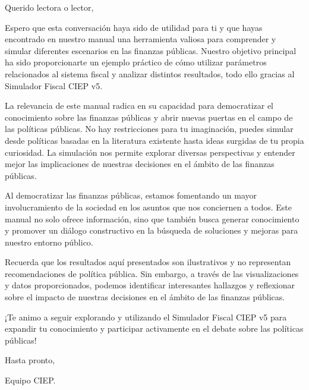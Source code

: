 Querido lectora o lector,

Espero que esta conversación haya sido de utilidad para ti y que hayas
encontrado en nuestro manual una herramienta valiosa para comprender y
simular diferentes escenarios en las finanzas públicas. Nuestro objetivo
principal ha sido proporcionarte un ejemplo práctico de cómo utilizar
parámetros relacionados al sistema fiscal y analizar distintos
resultados, todo ello gracias al Simulador Fiscal CIEP v5.

La relevancia de este manual radica en su capacidad para democratizar el
conocimiento sobre las finanzas públicas y abrir nuevas puertas en el
campo de las políticas públicas. No hay restricciones para tu
imaginación, puedes simular desde políticas basadas en la literatura
existente hasta ideas surgidas de tu propia curiosidad. La simulación
nos permite explorar diversas perspectivas y entender mejor las
implicaciones de nuestras decisiones en el ámbito de las finanzas
públicas.

Al democratizar las finanzas públicas, estamos fomentando un mayor
involucramiento de la sociedad en los asuntos que nos conciernen a
todos. Este manual no solo ofrece información, sino que también busca
generar conocimiento y promover un diálogo constructivo en la búsqueda
de soluciones y mejoras para nuestro entorno público.

Recuerda que los resultados aquí presentados son ilustrativos y no
representan recomendaciones de política pública. Sin embargo, a través
de las visualizaciones y datos proporcionados, podemos identificar
interesantes hallazgos y reflexionar sobre el impacto de nuestras
decisiones en el ámbito de las finanzas públicas.

¡Te animo a seguir explorando y utilizando el Simulador Fiscal CIEP v5
para expandir tu conocimiento y participar activamente en el debate
sobre las políticas públicas!

Hasta pronto,

Equipo CIEP.





